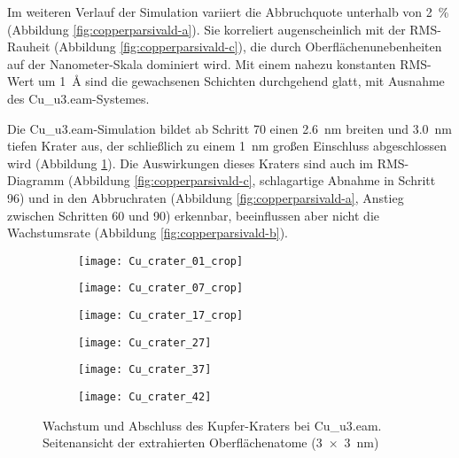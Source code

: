Im weiteren Verlauf der Simulation variiert die Abbruchquote unterhalb von \SI{2}{\percent} (Abbildung \ref{fig:copperparsivald-a}).
Sie korreliert augenscheinlich mit der RMS-Rauheit (Abbildung \ref{fig:copperparsivald-c}), die durch Oberflächenunebenheiten auf der Nanometer-Skala dominiert wird.
Mit einem nahezu konstanten RMS-Wert um \SI{1}{\angstrom} sind die gewachsenen Schichten durchgehend glatt, mit Ausnahme des Cu\_u3.eam-Systemes.

Die Cu\_u3.eam-Simulation bildet ab Schritt 70 einen \SI{2.6}{\nano\meter} breiten und \SI{3.0}{\nano\meter} tiefen Krater aus, der schließlich zu einem \SI{1}{\nano\meter} großen Einschluss abgeschlossen wird (Abbildung \ref{fig:coppercrater}).
Die Auswirkungen dieses Kraters sind auch im RMS-Diagramm (Abbildung \ref{fig:copperparsivald-c}, schlagartige Abnahme in Schritt 96) und in den Abbruchraten (Abbildung \ref{fig:copperparsivald-a}, Anstieg zwischen Schritten 60 und 90) erkennbar, beeinflussen aber nicht die Wachstumsrate (Abbildung \ref{fig:copperparsivald-b}).

\begin{figure}[bthp]

  \captionsetup[subfigure]{justification=centering,singlelinecheck=false}
  \def\subfigwidth{0.32\textwidth}

  \begin{subfigure}[t]{\subfigwidth}
    \texttt{[image: Cu\_crater\_01\_crop]}
  \end{subfigure}
  \hfill
  \begin{subfigure}[t]{\subfigwidth}
    \texttt{[image: Cu\_crater\_07\_crop]}
  \end{subfigure}
  \hfill
  \begin{subfigure}[t]{\subfigwidth}
    \texttt{[image: Cu\_crater\_17\_crop]}
  \end{subfigure}

  \begin{subfigure}[t]{\subfigwidth}
    \texttt{[image: Cu\_crater\_27]}
  \end{subfigure}
  \hfill
  \begin{subfigure}[t]{\subfigwidth}
    \texttt{[image: Cu\_crater\_37]}
  \end{subfigure}
  \hfill
  \begin{subfigure}[t]{\subfigwidth}
    \texttt{[image: Cu\_crater\_42]}
  \end{subfigure}

  \caption{Wachstum und Abschluss des Kupfer-Kraters bei Cu\_u3.eam.\\
    Seitenansicht der extrahierten Oberflächenatome (\SI{3x3}{\nano\meter})
  }
  \label{fig:coppercrater}
\end{figure}


